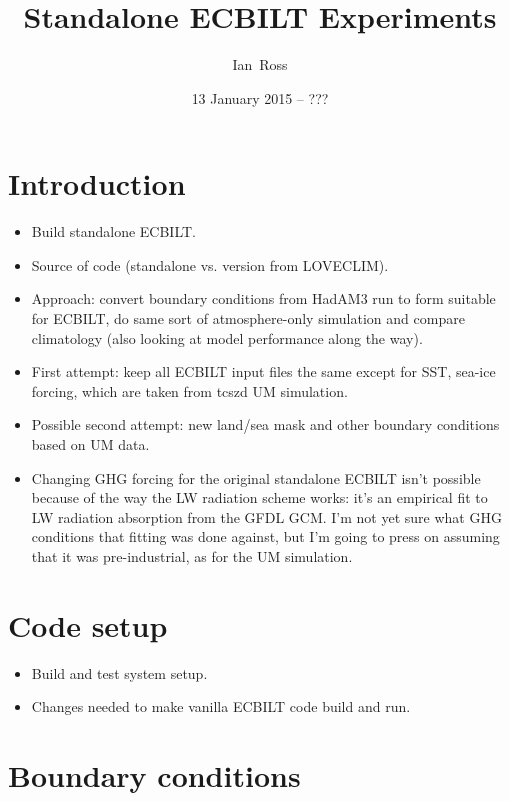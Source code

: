 \documentclass[a4paper,11pt,article]{memoir}
\title{Standalone ECBILT Experiments}
\author{Ian~Ross}
\date{13 January 2015 -- ???}
\begin{document}
\maketitle

\chapter{Introduction}

\begin{itemize}
  \item{Build standalone ECBILT.}
  \item{Source of code (standalone vs. version from LOVECLIM).}
  \item{Approach: convert boundary conditions from HadAM3 run to form
    suitable for ECBILT, do same sort of atmosphere-only simulation
    and compare climatology (also looking at model performance along
    the way).}
  \item{First attempt: keep all ECBILT input files the same except for
    SST, sea-ice forcing, which are taken from tcszd UM simulation.}
  \item{Possible second attempt: new land/sea mask and other boundary
    conditions based on UM data.}
  \item{Changing GHG forcing for the original standalone ECBILT isn't
    possible because of the way the LW radiation scheme works: it's an
    empirical fit to LW radiation absorption from the GFDL GCM.  I'm
    not yet sure what GHG conditions that fitting was done against,
    but I'm going to press on assuming that it was pre-industrial, as
    for the UM simulation.}
\end{itemize}


\chapter{Code setup}

\begin{itemize}
  \item{Build and test system setup.}
  \item{Changes needed to make vanilla ECBILT code build and run.}
\end{itemize}


\chapter{Boundary conditions}
\end{document}
